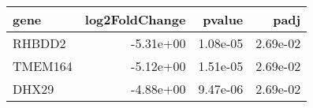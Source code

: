 \begin{tabular}{lrrr}
\toprule
   gene &  log2FoldChange &   pvalue &     padj \\
\midrule
 RHBDD2 &       -5.31e+00 & 1.08e-05 & 2.69e-02 \\
TMEM164 &       -5.12e+00 & 1.51e-05 & 2.69e-02 \\
  DHX29 &       -4.88e+00 & 9.47e-06 & 2.69e-02 \\
\bottomrule
\end{tabular}

